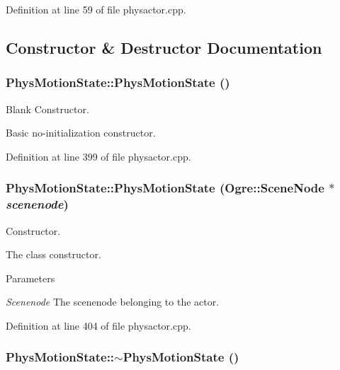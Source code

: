 Definition at line 59 of file physactor.cpp.



\subsection{Constructor \& Destructor Documentation}
\hypertarget{classPhysMotionState_a8439c3835b9d96b0b1b285126df41a42}{
\subsubsection[{PhysMotionState}]{\setlength{\rightskip}{0pt plus 5cm}PhysMotionState::PhysMotionState ()}}
\label{d2/d14/classPhysMotionState_a8439c3835b9d96b0b1b285126df41a42}


Blank Constructor. 

Basic no-\/initialization constructor. 

Definition at line 399 of file physactor.cpp.

\hypertarget{classPhysMotionState_a9c315b85bc405a36a6bd9d9a9f68c34a}{
\subsubsection[{PhysMotionState}]{\setlength{\rightskip}{0pt plus 5cm}PhysMotionState::PhysMotionState (Ogre::SceneNode $\ast$ {\em scenenode})}}
\label{d2/d14/classPhysMotionState_a9c315b85bc405a36a6bd9d9a9f68c34a}


Constructor. 

The class constructor. 
\begin{DoxyParams}{Parameters}
\item[{\em Scenenode}]The scenenode belonging to the actor. \end{DoxyParams}


Definition at line 404 of file physactor.cpp.

\hypertarget{classPhysMotionState_a74441aa0ba9a1b99ee1662b2eee9db3c}{
\subsubsection[{$\sim$PhysMotionState}]{\setlength{\rightskip}{0pt plus 5cm}PhysMotionState::$\sim$PhysMotionState ()}}
\label{d2/d14/classPhysMotionState_a74441aa0ba9a1b99ee1662b2eee9db3c}


